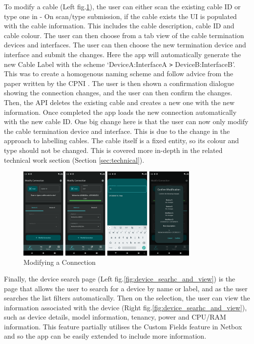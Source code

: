 \documentclass [11pt,a4paper]{article}
\begin{document}
To modify a cable (Left fig.\ref{fig:modify_connection}), the user can either scan the existing cable ID or type one in - On scan/type submission, if the cable exists the UI is populated with the cable information. This includes the cable description, cable ID and cable colour. The user can then choose from a tab view of the cable termination devices and interfaces. The user can then choose the new termination device and interface and submit the changes. Here the app will automatically generate the new Cable Label with the scheme `DeviceA:InterfaceA \verb|>| DeviceB:InterfaceB'. This was to create a homogenous naming scheme and follow advice from the paper written by the CPNI \cite{cpni}. The user is then shown a confirmation dialogue showing the connection changes, and the user can then confirm the changes. Then, the API deletes the existing cable and creates a new one with the new information. Once completed the app loads the new connection automatically with the new cable ID. One big change here is that the user can now only modify the cable termination device and interface. This is due to the change in the approach to labelling cables. The cable itself is a fixed entity, so its colour and type should not be changed. This is covered more in-depth in the related technical work section (Section \ref{sec:technical}).

\begin{figure}[H]
    \centering
    \includegraphics[width=0.8\textwidth]{images/final_modify.png}
    \caption{Modifying a Connection}
    \label{fig:modify_connection}
\end{figure}

Finally, the device search page (Left fig.\ref{fig:device_searhc_and_view}) is the page that allows the user to search for a device by name or label, and as the user searches the list filters automatically. Then on the selection, the user can view the information associated with the device (Right fig.\ref{fig:device_searhc_and_view}), such as device details, model information, tenancy, power and CPU/RAM information. This feature partially utilises the Custom Fields feature in Netbox and so the app can be easily extended to include more information.
\end{document}
